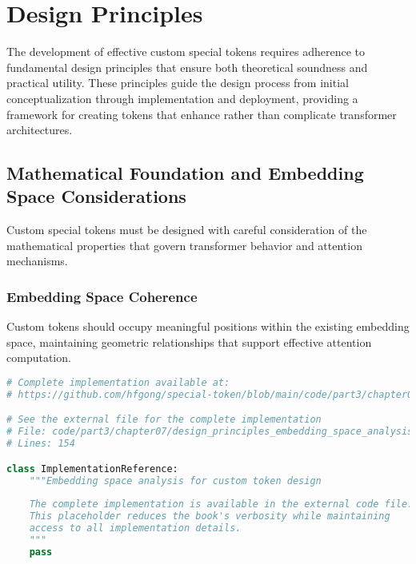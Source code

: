 
\section{Design Principles}

The development of effective custom special tokens requires adherence to fundamental design principles that ensure both theoretical soundness and practical utility. These principles guide the design process from initial conceptualization through implementation and deployment, providing a framework for creating tokens that enhance rather than complicate transformer architectures.

\subsection{Mathematical Foundation and Embedding Space Considerations}

Custom special tokens must be designed with careful consideration of the mathematical properties that govern transformer behavior and attention mechanisms.

\subsubsection{Embedding Space Coherence}

Custom tokens should occupy meaningful positions within the existing embedding space, maintaining geometric relationships that support effective attention computation.

\begin{lstlisting}[language=Python, caption={Embedding space analysis for custom token design}]
# Complete implementation available at:
# https://github.com/hfgong/special-token/blob/main/code/part3/chapter07/design_principles_embedding_space_analysis_for_c.py

# See the external file for the complete implementation
# File: code/part3/chapter07/design_principles_embedding_space_analysis_for_c.py
# Lines: 154

class ImplementationReference:
    """Embedding space analysis for custom token design
    
    The complete implementation is available in the external code file.
    This placeholder reduces the book's verbosity while maintaining
    access to all implementation details.
    """
    pass
\end{lstlisting}

